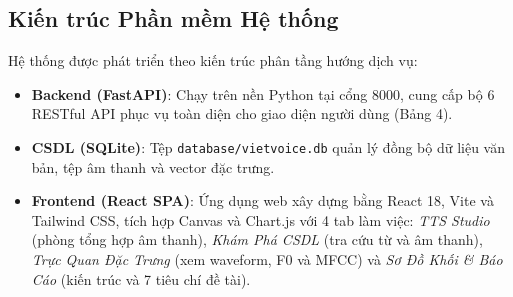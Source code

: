 \subsection{Kiến trúc Phần mềm Hệ thống}

Hệ thống được phát triển theo kiến trúc phân tầng hướng dịch vụ:
\begin{itemize}
    \item \textbf{Backend (FastAPI)}: Chạy trên nền Python tại cổng 8000, cung cấp bộ 6 RESTful API phục vụ toàn diện cho giao diện người dùng (Bảng 4).
    \item \textbf{CSDL (SQLite)}: Tệp \texttt{database/vietvoice.db} quản lý đồng bộ dữ liệu văn bản, tệp âm thanh và vector đặc trưng.
    \item \textbf{Frontend (React SPA)}: Ứng dụng web xây dựng bằng React 18, Vite và Tailwind CSS, tích hợp Canvas và Chart.js với 4 tab làm việc: \textit{TTS Studio} (phòng tổng hợp âm thanh), \textit{Khám Phá CSDL} (tra cứu từ và âm thanh), \textit{Trực Quan Đặc Trưng} (xem waveform, F0 và MFCC) và \textit{Sơ Đồ Khối \& Báo Cáo} (kiến trúc và 7 tiêu chí đề tài).
\end{itemize}

